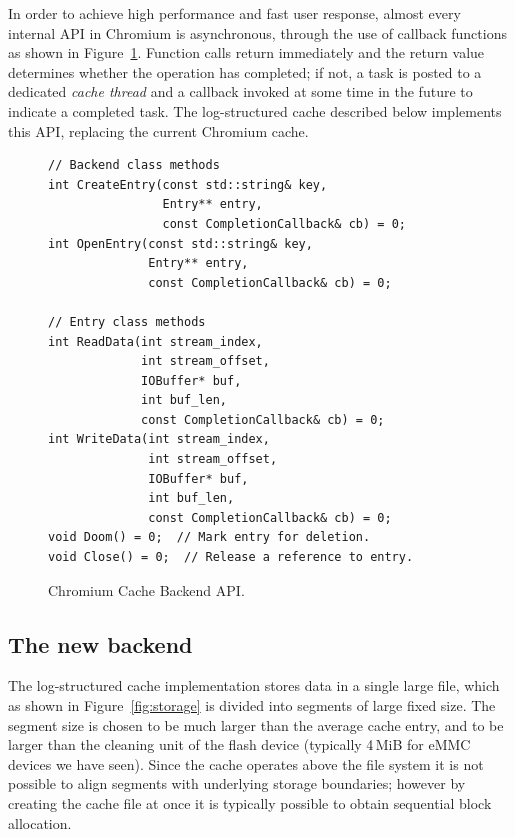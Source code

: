 \documentclass{sig-alternate}
\begin{document}
In order to achieve high performance and fast user response, almost every
internal API in Chromium is asynchronous, through the use of callback functions
as shown in Figure~\ref{cache-api}.  Function calls return immediately and the
return value determines whether the operation has completed; if not, a task is
posted to a dedicated \emph{cache thread} and a callback invoked at some time in
the future to indicate a completed task.  The log-structured cache described
below implements this API, replacing the current Chromium cache.

\begin{figure}[h]
{\small
\begin{verbatim}
// Backend class methods
int CreateEntry(const std::string& key,
                Entry** entry,
                const CompletionCallback& cb) = 0;
int OpenEntry(const std::string& key,
              Entry** entry,
              const CompletionCallback& cb) = 0;

// Entry class methods
int ReadData(int stream_index,
             int stream_offset,
             IOBuffer* buf,
             int buf_len,
             const CompletionCallback& cb) = 0;
int WriteData(int stream_index,
              int stream_offset,
              IOBuffer* buf,
              int buf_len,
              const CompletionCallback& cb) = 0;
void Doom() = 0;  // Mark entry for deletion.
void Close() = 0;  // Release a reference to entry.
\end{verbatim}
}
\caption{Chromium Cache Backend API.}
\label{cache-api}
\end{figure}

\subsection{The new backend}

The log-structured cache implementation stores data in a single large file,
which as shown in Figure~\ref{fig:storage} is divided into segments of large
fixed size.  The segment size is chosen to be much larger than the average cache
entry, and to be larger than the cleaning unit of the flash device (typically
4\,MiB for eMMC devices we have seen).  Since the cache operates above the file
system it is not possible to align segments with underlying storage boundaries;
however by creating the cache file at once it is typically possible to obtain
sequential block allocation.
\end{document}
